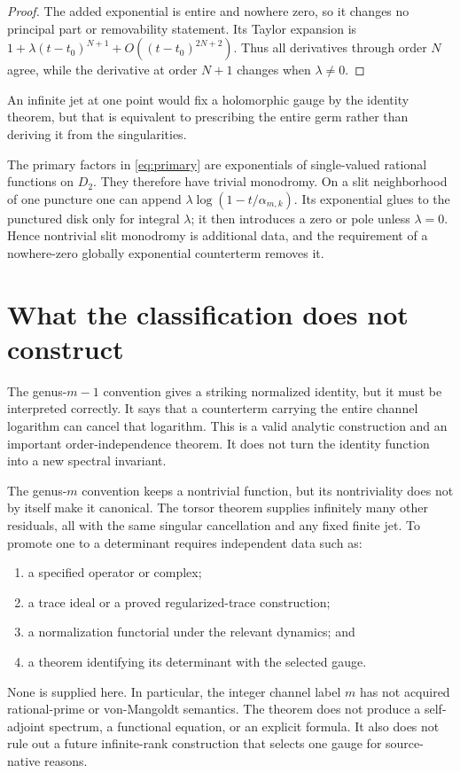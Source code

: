 \documentclass[11pt]{article}
\begin{document}
\begin{proof}
The added exponential is entire and nowhere zero, so it changes no principal
part or removability statement.  Its Taylor expansion is
\(1+\lambda(t-t_0)^{N+1}+O((t-t_0)^{2N+2})\).  Thus all derivatives through
order \(N\) agree, while the derivative at order \(N+1\) changes when
\(\lambda\ne0\).
\end{proof}

An infinite jet at one point would fix a holomorphic gauge by the identity
theorem, but that is equivalent to prescribing the entire germ rather than
deriving it from the singularities.

The primary factors in \cref{eq:primary} are exponentials of single-valued
rational functions on \(D_2\).  They therefore have trivial monodromy.  On a
slit neighborhood of one puncture one can append
\(\lambda\log(1-t/\alpha_{m,k})\).  Its exponential glues to the punctured
disk only for integral \(\lambda\); it then introduces a zero or pole unless
\(\lambda=0\).  Hence nontrivial slit monodromy is additional data, and the
requirement of a nowhere-zero globally exponential counterterm removes it.

\section{What the classification does not construct}

The genus-\(m-1\) convention gives a striking normalized identity, but it
must be interpreted correctly.  It says that a counterterm carrying the
entire channel logarithm can cancel that logarithm.  This is a valid analytic
construction and an important order-independence theorem.  It does not turn
the identity function into a new spectral invariant.

The genus-\(m\) convention keeps a nontrivial function, but its nontriviality
does not by itself make it canonical.  The torsor theorem supplies infinitely
many other residuals, all with the same singular cancellation and any fixed
finite jet.  To promote one to a determinant requires independent data such
as:
\begin{enumerate}
 \item a specified operator or complex;
 \item a trace ideal or a proved regularized-trace construction;
 \item a normalization functorial under the relevant dynamics; and
 \item a theorem identifying its determinant with the selected gauge.
\end{enumerate}
None is supplied here.  In particular, the integer channel label \(m\) has
not acquired rational-prime or von-Mangoldt semantics.  The theorem does not
produce a self-adjoint spectrum, a functional equation, or an explicit
formula.  It also does not rule out a future infinite-rank construction that
selects one gauge for source-native reasons.
\end{document}
